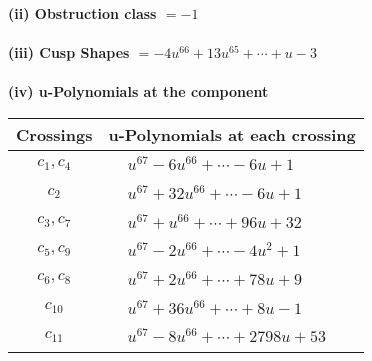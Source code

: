 \documentclass[1p]{elsarticle_modified}
\theoremstyle{definition}
\begin{document}
\flushleft \textbf{(ii) Obstruction class $= -1$}\\~\\
\flushleft \textbf{(iii) Cusp Shapes $= -4 u^{66}+13 u^{65}+\cdots+u-3$}\\~\\
\newpage\renewcommand{\arraystretch}{1}
\flushleft \textbf{(iv) u-Polynomials at the component}\newline \\
\begin{tabular}{m{50pt}|m{274pt}}
Crossings & \hspace{64pt}u-Polynomials at each crossing \\
\hline $$\begin{aligned}c_{1},c_{4}\end{aligned}$$&$\begin{aligned}
&u^{67}-6 u^{66}+\cdots-6 u+1
\end{aligned}$\\
\hline $$\begin{aligned}c_{2}\end{aligned}$$&$\begin{aligned}
&u^{67}+32 u^{66}+\cdots-6 u+1
\end{aligned}$\\
\hline $$\begin{aligned}c_{3},c_{7}\end{aligned}$$&$\begin{aligned}
&u^{67}+u^{66}+\cdots+96 u+32
\end{aligned}$\\
\hline $$\begin{aligned}c_{5},c_{9}\end{aligned}$$&$\begin{aligned}
&u^{67}-2 u^{66}+\cdots-4 u^2+1
\end{aligned}$\\
\hline $$\begin{aligned}c_{6},c_{8}\end{aligned}$$&$\begin{aligned}
&u^{67}+2 u^{66}+\cdots+78 u+9
\end{aligned}$\\
\hline $$\begin{aligned}c_{10}\end{aligned}$$&$\begin{aligned}
&u^{67}+36 u^{66}+\cdots+8 u-1
\end{aligned}$\\
\hline $$\begin{aligned}c_{11}\end{aligned}$$&$\begin{aligned}
&u^{67}-8 u^{66}+\cdots+2798 u+53
\end{aligned}$\\
\hline
\end{tabular}\\~\\
\end{document}
